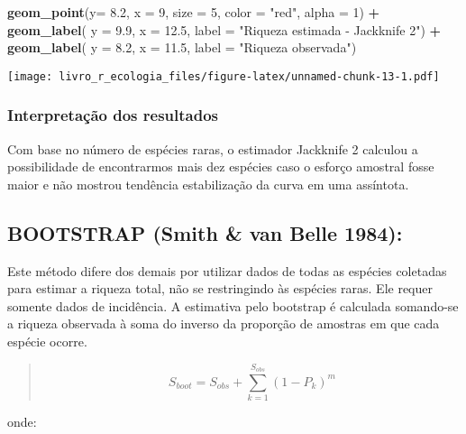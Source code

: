 \documentclass[
]{book}
\newenvironment{Shaded}{\begin{snugshade}}{\end{snugshade}}
\newcommand{\DataTypeTok}[1]{\textcolor[rgb]{0.13,0.29,0.53}{#1}}
\newcommand{\DecValTok}[1]{\textcolor[rgb]{0.00,0.00,0.81}{#1}}
\newcommand{\FloatTok}[1]{\textcolor[rgb]{0.00,0.00,0.81}{#1}}
\newcommand{\KeywordTok}[1]{\textcolor[rgb]{0.13,0.29,0.53}{\textbf{#1}}}
\newcommand{\NormalTok}[1]{#1}
\newcommand{\OperatorTok}[1]{\textcolor[rgb]{0.81,0.36,0.00}{\textbf{#1}}}
\newcommand{\StringTok}[1]{\textcolor[rgb]{0.31,0.60,0.02}{#1}}
\begin{document}
\begin{Shaded}
\begin{Highlighting}[]
\StringTok{  }\KeywordTok{geom_point}\NormalTok{(}\DataTypeTok{y=} \FloatTok{8.2}\NormalTok{, }\DataTypeTok{x =} \DecValTok{9}\NormalTok{, }\DataTypeTok{size =} \DecValTok{5}\NormalTok{, }\DataTypeTok{color =} \StringTok{"red"}\NormalTok{, }\DataTypeTok{alpha =} \DecValTok{1}\NormalTok{) }\OperatorTok{+}\StringTok{ }
\StringTok{  }\KeywordTok{geom_label}\NormalTok{( }\DataTypeTok{y =} \FloatTok{9.9}\NormalTok{, }\DataTypeTok{x =} \FloatTok{12.5}\NormalTok{, }\DataTypeTok{label =} \StringTok{"Riqueza estimada - Jackknife 2"}\NormalTok{) }\OperatorTok{+}
\StringTok{  }\KeywordTok{geom_label}\NormalTok{( }\DataTypeTok{y =} \FloatTok{8.2}\NormalTok{, }\DataTypeTok{x =} \FloatTok{11.5}\NormalTok{, }\DataTypeTok{label =} \StringTok{"Riqueza observada"}\NormalTok{)}
\end{Highlighting}
\end{Shaded}

\texttt{[image: livro\_r\_ecologia\_files/figure-latex/unnamed-chunk-13-1.pdf]}

\hypertarget{interpretauxe7uxe3o-dos-resultados-6}{%
\subsubsection{Interpretação dos resultados}\label{interpretauxe7uxe3o-dos-resultados-6}}

Com base no número de espécies raras, o estimador Jackknife 2 calculou a possibilidade de encontrarmos mais dez espécies caso o esforço amostral fosse maior e não mostrou tendência estabilização da curva em uma assíntota.

\hypertarget{bootstrap-smith-van-belle-1984}{%
\subsection{BOOTSTRAP (Smith \& van Belle 1984):}\label{bootstrap-smith-van-belle-1984}}

Este método difere dos demais por utilizar dados de todas as espécies coletadas para estimar a riqueza total, não se restringindo às espécies raras. Ele requer somente dados de incidência. A estimativa pelo bootstrap é calculada somando-se a riqueza observada à soma do inverso da proporção de amostras em que cada espécie ocorre.

\begin{quote}
\[S_{boot} = S_{obs} + \sum_{k=1}^{S_{obs}}(1-P_k)^m\]
\end{quote}

onde:
\end{document}

